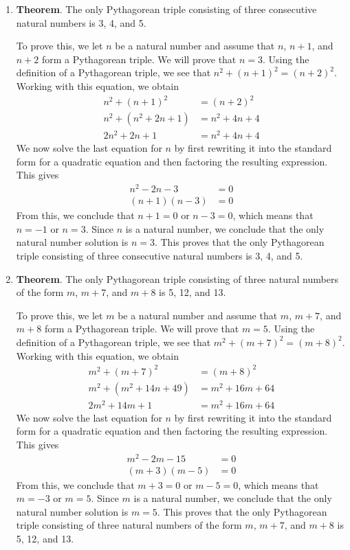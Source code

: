\documentclass[11pt]{article}
\begin{document}
\begin{enumerate}
  \item \textbf{Theorem}.  The only Pythagorean triple consisting of three consecutive natural numbers is 3, 4, and 5.

\begin{myproof}
To prove this, we let $n$ be a natural number and assume that $n$, $n + 1$, and $n + 2$ form a Pythagorean triple.  We will prove that $n = 3$.  Using the definition of a Pythagorean triple, we see that $n^2 + (n + 1)^2 = (n + 2)^2$.  Working with this equation, we obtain
\begin{align*}
n^2 + (n + 1)^2 &= (n + 2)^2 \\
n^2 + \left( n^2 + 2n + 1 \right) &= n^2 + 4n + 4 \\
2n^2 + 2n + 1 &= n^2 + 4n + 4
\end{align*}
We now solve the last equation for $n$ by first rewriting it into the standard form for a quadratic equation and then factoring the resulting expression.  This gives
\begin{align*}
n^2 - 2n - 3 &= 0 \\
(n + 1)(n - 3) &= 0
\end{align*}
From this, we conclude that $n + 1 = 0$ or $n - 3 = 0$, which means that $n = -1$ or $n = 3$.  Since $n$ is a natural number, we conclude that the only natural number solution is $n = 3$.  This proves that the only Pythagorean triple consisting of three consecutive natural numbers is 3, 4, and 5.
\end{myproof}


\newpage
  \item \textbf{Theorem}.  The only Pythagorean triple consisting of three natural numbers of the form $m$, $m + 7$, and $m + 8$ is 5, 12, and 13.

\begin{myproof}
To prove this, we let $m$ be a natural number and assume that $m$, $m+7$, and $m + 8$ form a Pythagorean triple.  We will prove that $m = 5$.  Using the definition of a Pythagorean triple, we see that $m^2 + (m + 7)^2 = (m + 8)^2$.  Working with this equation, we obtain
\begin{align*}
m^2 + (m + 7)^2 &= (m + 8)^2 \\
m^2 + \left( m^2 + 14n + 49 \right) &= m^2 + 16m + 64 \\
2m^2 + 14m + 1 &= m^2 + 16m + 64
\end{align*}
We now solve the last equation for $n$ by first rewriting it into the standard form for a quadratic equation and then factoring the resulting expression.  This gives
\begin{align*}
m^2 - 2m - 15 &= 0 \\
(m + 3)(m - 5) &= 0
\end{align*}
From this, we conclude that $m + 3 = 0$ or $m - 5 = 0$, which means that $m = -3$ or $m = 5$.  Since $m$ is a natural number, we conclude that the only natural number solution is $m = 5$.  This proves that the only Pythagorean triple consisting of three natural numbers of the form $m$, $m + 7$, and $m + 8$ is 5, 12, and 13.
\end{myproof}

\end{enumerate}
\end{document}

